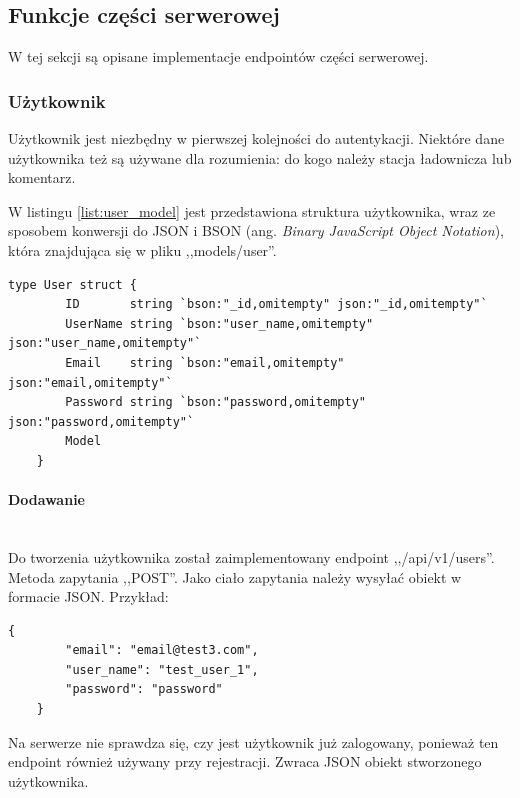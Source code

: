 % 
\subsection{Funkcje części serwerowej}
W tej sekcji są opisane implementacje endpointów części serwerowej.
% 
\subsubsection{Użytkownik}
Użytkownik jest niezbędny w pierwszej kolejności do autentykacji. Niektóre dane użytkownika też są używane dla rozumienia: do kogo należy stacja ładownicza lub komentarz.

W listingu \ref{list:user_model} jest przedstawiona struktura użytkownika, wraz ze sposobem konwersji do JSON i BSON (ang. \textit{Binary JavaScript Object Notation}), która znajdująca się w pliku ,,models/user''.
\begin{lstlisting}[label=list:user_model,caption=Model danych użytkownika,basicstyle=\tiny\ttfamily]
    type User struct {
        ID       string `bson:"_id,omitempty" json:"_id,omitempty"`
        UserName string `bson:"user_name,omitempty" json:"user_name,omitempty"`
        Email    string `bson:"email,omitempty" json:"email,omitempty"`
        Password string `bson:"password,omitempty" json:"password,omitempty"`
        Model
    }
\end{lstlisting}

% 
\paragraph{Dodawanie}\mbox{}\\
Do tworzenia użytkownika został zaimplementowany endpoint ,,/api/v1/users''.
Metoda zapytania ,,POST''.
Jako ciało zapytania należy wysyłać obiekt w formacie JSON. Przykład:
\begin{lstlisting}[basicstyle=\tiny\ttfamily]
    {
        "email": "email@test3.com",
        "user_name": "test_user_1",
        "password": "password"
    }
\end{lstlisting}
Na serwerze nie sprawdza się, czy jest użytkownik już zalogowany, ponieważ ten endpoint również używany przy rejestracji.
Zwraca JSON obiekt stworzonego użytkownika.

